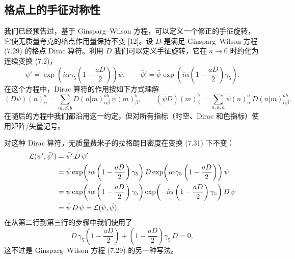 \subsection{格点上的手征对称性}

我们已经预告过，基于 Ginsparg--Wilson 方程，可以定义一个修正的手征旋转，它使无质量夸克的格点作用量保持不变 [12]。设 $D$ 是满足 Ginsparg--Wilson 方程 (7.29) 的格点 Dirac 算符。利用 $D$ 我们可以定义手征旋转，它在 $a \to 0$ 时约化为连续变换 (7.2)，
\begin{equation}
  \psi' = \exp\!\left(i\alpha\gamma_5\left(1-\frac{aD}{2}\right)\right)\psi,
  \qquad
  \bar\psi' = \bar\psi\exp\!\left(i\alpha\left(1-\frac{aD}{2}\right)\gamma_5\right).
\end{equation}
在这个方程中，Dirac 算符的作用按如下方式理解
\begin{equation}
  (D\psi)(n)^a_\alpha = \sum_{m,\beta,b} D(n|m)^{ab}_{\alpha\beta}\,\psi(m)^b_\beta,
  \qquad
  (\bar\psi D)(m)^b_\beta = \sum_{n,\alpha,a} \bar\psi(n)^a_\alpha\,D(n|m)^{ab}_{\alpha\beta}.
\end{equation}
在随后的方程中我们都沿用这一约定，但对所有指标（时空、Dirac 和色指标）使用矩阵/矢量记号。

对这种 Dirac 算符，无质量费米子的拉格朗日密度在变换 (7.31) 下不变：
\begin{align}
  \mathcal{L}(\psi',\bar\psi') &= \bar\psi'\,D\,\psi' \notag\\
  &= \bar\psi\exp\!\left(i\alpha\left(1-\frac{aD}{2}\right)\gamma_5\right)D
     \exp\!\left(i\alpha\gamma_5\left(1-\frac{aD}{2}\right)\right)\psi \notag\\
  &= \bar\psi\exp\!\left(i\alpha\left(1-\frac{aD}{2}\right)\gamma_5\right)
     \exp\!\left(-i\alpha\left(1-\frac{aD}{2}\right)\gamma_5\right)D\,\psi \notag\\
  &= \bar\psi\,D\,\psi = \mathcal{L}(\psi,\bar\psi) .
\end{align}
在从第二行到第三行的步骤中我们使用了
\begin{equation}
  D\,\gamma_5\left(1-\frac{aD}{2}\right) + \left(1-\frac{aD}{2}\right)\gamma_5\,D = 0,
\end{equation}
这不过是 Ginsparg--Wilson 方程 (7.29) 的另一种写法。

